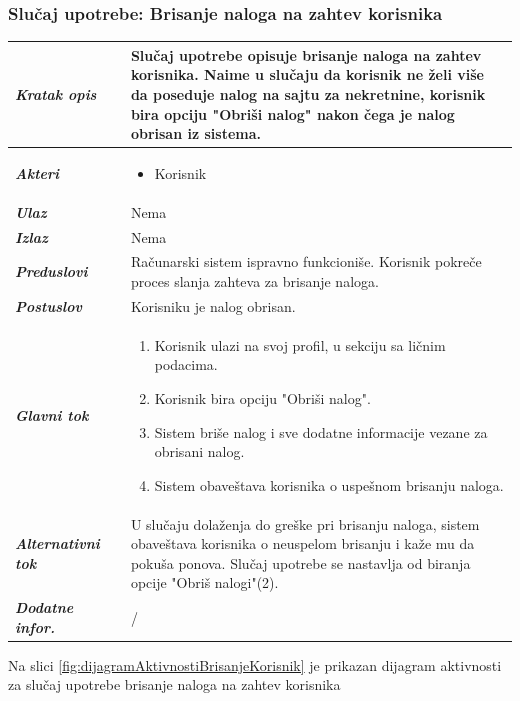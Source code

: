 \documentclass[20pt]{article}
\begin{document}
\subsubsection{\bfseries\large Slu\v{c}aj upotrebe: Brisanje naloga na zahtev korisnika}
\begin{center}
\begin{longtable}{p{0.23\linewidth} p{0.77\linewidth}}
\hline
 {\it \bfseries Kratak opis} & Slu\v {c}aj upotrebe opisuje brisanje naloga na zahtev korisnika. Naime u slu\v {c}aju da korisnik ne \v {z}eli vi\v {s}e da poseduje nalog na sajtu za nekretnine, korisnik bira opciju "Obri\v {s}i nalog" nakon \v {c}ega je nalog obrisan iz sistema.\\ 
 \hline
 {\it \bfseries Akteri} & \begin{itemize}
    \item Korisnik
\end{itemize}\\
\hline

 {\it \bfseries Ulaz} & Nema\\
 \hline
 
 {\it \bfseries Izlaz} & Nema\\
 \hline
 
 {\it \bfseries Preduslovi} & Ra\v {c}unarski sistem ispravno funkcioni\v {s}e. Korisnik pokre\v {c}e proces slanja zahteva za brisanje naloga.\\
 \hline
 
 {\it \bfseries Postuslov} & Korisniku je nalog obrisan.\\
 \hline

     {\it \bfseries Glavni tok} &  
     \begin{enumerate}
         \item Korisnik ulazi na svoj profil, u sekciju sa li\v {c}nim podacima.
         \item Korisnik bira opciju "Obri\v {s}i nalog".
         \item Sistem bri\v {s}e nalog i sve dodatne informacije vezane za obrisani nalog.
         \item Sistem obave\v {s}tava korisnika o uspe\v {s}nom brisanju naloga.
    \end{enumerate}\\
 \hline
 {\it \bfseries Alternativni tok} & U slu\v {c}aju dola\v {z}enja do gre\v {s}ke pri brisanju naloga, sistem obave\v {s}tava korisnika o neuspelom brisanju i ka\v {z}e mu da poku\v {s}a ponova. Slu\v {c}aj upotrebe se nastavlja od biranja opcije "Obri\v {s} nalogi"(2).\\
 \hline
 {\it \bfseries Dodatne infor.} & /\\
 \hline


\end{longtable}
\end{center}
\newpage
{}
\setlength{\parindent}{1cm}
\fontsize{13}{18} \selectfont 
Na slici \ref{fig:dijagramAktivnostiBrisanjeKorisnik} je prikazan dijagram aktivnosti za slu\v{c}aj upotrebe brisanje naloga na zahtev korisnika
\end{document}
